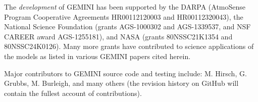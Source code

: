 \documentclass[11pt,letterpaper]{article}
\begin{document}
The \emph{development} of GEMINI has been supported by the DARPA (AtmoSense Program Cooperative Agreements HR00112120003 and HR00112320043), the National Science Foundation (grants AGS-1000302 and AGS-1339537, and NSF CAREER award AGS-1255181), and NASA (grants 80NSSC21K1354 and 80NSSC24K0126).  Many more grants have contributed to science applications of the models as listed in various GEMINI papers cited herein.  

Major contributors to GEMINI source code and testing include:  M. Hirsch, G. Grubbs, M. Burleigh, and many others (the revision history on GitHub will contain the fullest account of contributions).


\pagebreak
\setcounter{page}{1}


\end{document}
